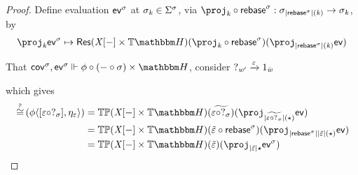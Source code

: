 \begin{proof}
Define evaluation $\mathsf{ev}^\sigma$ at $\sigma_{\mathit{k}} \in \Sigma^\sigma$,
via $\proj_\vk \comp \rebase^\sigma : \sigma_{\indF{\rebase^\sigma}(\vk)} \to \sigma_\vk$, by 
\[ \proj_\vk \ev^\sigma \mapsto \typeRes{(\vX\anyL\dash \times \theapF)}(\proj_\vk \comp \rebase^\sigma)(\proj_{\indF{\rebase^\sigma}(\vk)} \ev) \]

That $\cov^\sigma,\ev^\sigma \Vdash \phi \comp (\dash \comp \sigma) \times \heapF$, consider $?_{\mathit{w}'} \xrightarrow{\varepsilon} 1_{\hat{\mathit{w}}}$
\begin{center}
\end{center}
which gives
\begin{align*} 
    \hmonIso(\phi\pair{\anyL{\me \comp ?_\sigma}}{\mvarM_\me})
                    & = \thideMon(\vX\anyL\dash \times \theapF)(\widetilde{\me \comp ?_\sigma})(\proj_{\indF{\widetilde{\me \comp ?_\sigma}}(\star)} \ev) \\
                    & = \thideMon(\vX\anyL\dash \times \theapF)(\tilde\me \comp \rebase^\sigma)(\proj_{\indF{\rebase^\sigma}\indF{\tilde\me}(\star)} \ev) \\
                    & = \thideMon(\vX\anyL\dash \times \theapF)(\tilde\me)(\proj_{\indF{\tilde\me}\star} \ev^\sigma)
\end{align*} 
\end{proof}

